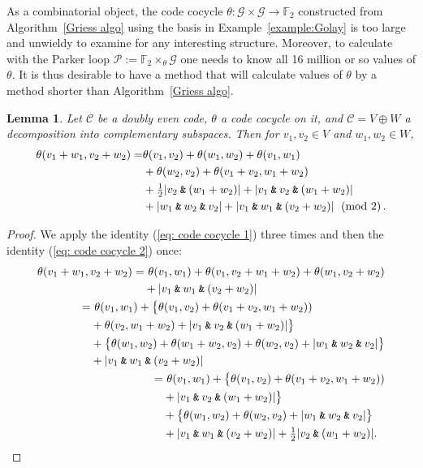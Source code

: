 \documentclass{article}
\theoremstyle{plain}
\newtheorem{lemma}{Lemma}
\theoremstyle{definition}
\def \cC {\mathcal{C}}
\def \cG {\mathcal{G}}
\def \cP {\mathcal{P}}
\def \FF {\mathbb{F}}
\newcommand{\AND}{\mathbin{\textup{\texttt{\&}}}}
\def\Plus{+}
\begin{document}
As a combinatorial object, the code cocycle $\theta\colon \cG \times \cG\to \FF_2$ constructed from Algorithm~\ref{Griess algo} using the basis in Example~\ref{example:Golay} is too large and unwieldy to examine for any interesting structure. 
Moreover, to calculate with the Parker loop $\cP := \FF_2\times_\theta \cG$ one needs to know all 16 million or so values of $\theta$.
It is thus desirable to have a method that will calculate values of $\theta$ by a method shorter than Algorithm~\ref{Griess algo}.

\begin{lemma}\label{lemma:formula lemma}
Let $\cC$ be a doubly even code, $\theta$ a code cocycle on it, and $\cC = V\oplus W$ a decomposition into complementary subspaces.
Then for $v_1,v_2\in V$ and $w_1,w_2\in W$,
\begin{align}\label{eq:theformula}
	\theta(v_1\Plus w_1,v_2\Plus w_2)	
		 =& \theta(v_1,v_2)  + \theta(w_1,w_2) + \theta(v_1,w_1) \\
		&+ \theta(w_2,v_2) + \theta(v_1\Plus v_2,w_1\Plus w_2) \nonumber \\
							& + \tfrac12|v_2\AND(w_1\Plus w_2)| + |v_1\AND v_2 \AND (w_1\Plus w_2)| \nonumber \\
							&+|w_1\AND w_2 \AND v_2| + \left|v_1\AND w_1 \AND (v_2 \Plus  w_2)\right| \pmod 2\,. \nonumber
\end{align}
\end{lemma}

\begin{proof}
We apply the identity (\ref{eq: code cocycle 1}) three times and then the identity (\ref{eq: code cocycle 2}) once:
\begin{align*}
\begin{split}
	\theta(v_1+w_1,v_2+w_2) =&\ \theta(v_1,w_1) + \theta(v_1,v_2+w_1+w_2) + \theta(w_1,v_2+w_2) \\
	&+ |v_1\AND w_1\AND(v_2+w_2)| 
\end{split}\\
\begin{split}
	 =&\ \theta(v_1,w_1) + \big\{ \theta(v_1,v_2) + \theta(v_1+v_2,w_1+w_2)) \\ 
	 & + \theta(v_2,w_1+w_2) + |v_1\AND v_2 \AND (w_1+w_2)| \big\} \\
	 & + \big\{\theta(w_1,w_2) + \theta(w_1+w_2,v_2) + \theta(w_2,v_2) + |w_1\AND w_2\AND v_2| \big\} \\
	 & + |v_1\AND w_1\AND(v_2+w_2)| 
\end{split}\\
\begin{split}
	 =&\ \theta(v_1,w_1) + \big\{ \theta(v_1,v_2) + \theta(v_1+v_2,w_1+w_2)) \\ 
	 & +  |v_1\AND v_2 \AND (w_1+w_2)| \big\} \\
	 & + \big\{\theta(w_1,w_2) + \theta(w_2,v_2) + |w_1\AND w_2\AND v_2| \big\} \\
	 & + |v_1\AND w_1\AND(v_2+w_2)| + \tfrac12|v_2\AND (w_1+w_2)|. \qedhere
\end{split}
\end{align*}
\end{proof}
\end{document}
